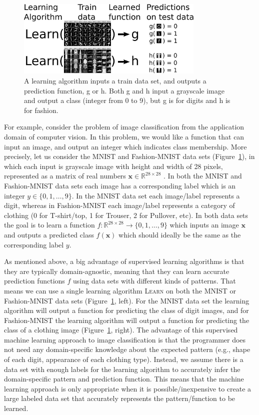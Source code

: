 \documentclass[12pt]{article}
\begin{document}
\begin{figure} 
  \centering
  \includegraphics[width=0.8\textwidth]{drawing-mnist-train-test.pdf}
  \caption{A learning algorithm inputs a train data set, and outputs a
    prediction function, g or h. Both g and h input a grayscale image
    and output a class (integer from 0 to 9), but g is for  
    digits and h is for fashion.}
  \label{fig:drawing-mnist-train-test}
\end{figure}

For example, consider the problem of image classification from the
application domain of computer vision. In this problem, we would like
a function that can input an image, and output an integer which
indicates class membership. More precisely, let us consider the MNIST
and Fashion-MNIST data sets
(Figure~\ref{fig:drawing-mnist-train-test}), in which each input is
grayscale image with height and width of 28 pixels, 
represented as a matrix of real numbers
$\mathbf x\in\mathbb R^{28\times 28}$ \citep{LeCun1998,Xiao2017}. In
both the MNIST and Fashion-MNIST data sets each image has a
corresponding label which is an integer $y\in\{0,1,\dots,9\}$. In the
MNIST data set each image/label represents a digit, whereas in
Fashion-MNIST each image/label represents a category of clothing (0
for T-shirt/top, 1 for Trouser, 2 for Pullover, etc).  In both data
sets the goal is to learn a function
$f:\mathbb R^{28\times 28}\rightarrow \{0,1,\dots, 9\}$ which inputs
an image $\mathbf x$ and outputs a predicted class $f(\mathbf x)$
which should ideally be the same as the corresponding label $y$.

As mentioned above, a big advantage of supervised learning algorithms
is that they are typically domain-agnostic, meaning that they can
learn accurate prediction functions $f$ using data sets with different
kinds of patterns. That means we can use a single learning algorithm
\textsc{Learn} on both the MNIST or Fashion-MNIST data sets
(Figure~\ref{fig:drawing-mnist-train-test}, left). For the MNIST data
set the learning algorithm will output a function for predicting the
class of digit images, and for Fashion-MNIST the learning algorithm
will output a function for predicting the class of a clothing image
(Figure~\ref{fig:drawing-mnist-train-test}, right). The advantage of
this supervised machine learning approach to image classification is
that the programmer does not need any domain-specific knowledge about
the expected pattern (e.g., shape of each digit, appearance of each
clothing type). Instead, we assume there is a data set with enough
labels for the learning algorithm to accurately infer the
domain-specific pattern and prediction function. This means that the
machine learning approach is only appropriate when it is
possible/inexpensive to create a large labeled data set that
accurately represents the pattern/function to be learned.
\end{document}
